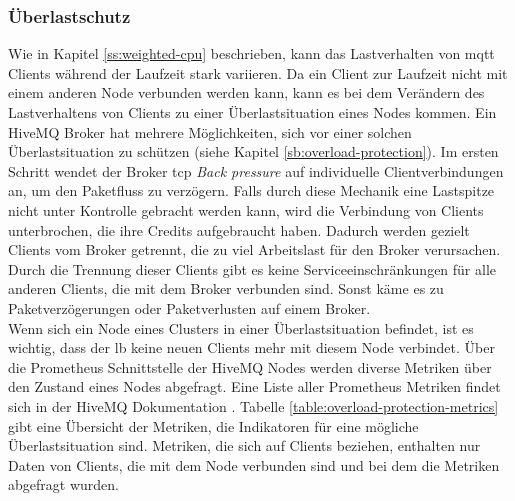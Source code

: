 \newpage
\null
\newpage
\subsubsection{Überlastschutz} \label{ss:circuit-breaking}
Wie in Kapitel \ref{ss:weighted-cpu} beschrieben, kann das Lastverhalten von \ac{mqtt} Clients während der Laufzeit stark variieren. Da ein Client zur Laufzeit nicht mit einem anderen Node verbunden werden kann, kann es bei dem Verändern des Lastverhaltens von Clients zu einer Überlastsituation eines Nodes kommen.
Ein HiveMQ Broker hat mehrere Möglichkeiten, sich vor einer solchen Überlastsituation zu schützen (siehe Kapitel \ref{sb:overload-protection}).
Im ersten Schritt wendet der Broker \ac{tcp} \textit{Back pressure} auf individuelle Clientverbindungen an, um den Paketfluss zu verzögern.
Falls durch diese Mechanik eine Lastspitze nicht unter Kontrolle gebracht werden kann, wird die Verbindung von Clients unterbrochen, die ihre Credits aufgebraucht haben.
Dadurch werden gezielt Clients vom Broker getrennt, die zu viel Arbeitslast für den Broker verursachen.
Durch die Trennung dieser Clients gibt es keine Serviceeinschränkungen für alle anderen Clients, die mit dem Broker verbunden sind.
Sonst käme es zu Paketverzögerungen oder Paketverlusten auf einem Broker.
\\
Wenn sich ein Node eines Clusters in einer Überlastsituation befindet, ist es wichtig, dass der \acl{lb} keine neuen Clients mehr mit diesem Node verbindet.
Über die Prometheus Schnittstelle der HiveMQ Nodes werden diverse Metriken über den Zustand eines Nodes abgefragt.
Eine Liste aller Prometheus Metriken findet sich in der HiveMQ Dokumentation \cite{MonitoringHiveMQDocumentation}.
Tabelle \ref{table:overload-protection-metrics} gibt eine Übersicht der Metriken, die Indikatoren für eine mögliche Überlastsituation sind. Metriken, die sich auf Clients beziehen, enthalten nur Daten von Clients, die mit dem Node verbunden sind und bei dem die Metriken abgefragt wurden.
